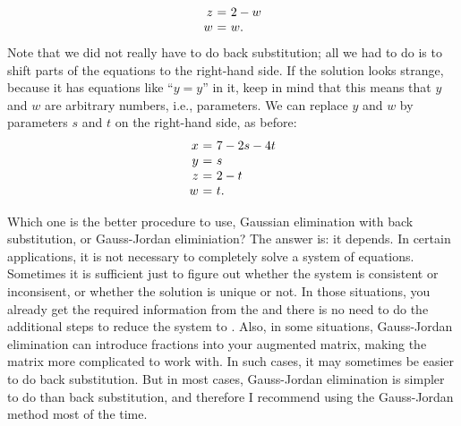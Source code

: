 \begin{solution}
\begin{equation*}
\begin{array}{r@{~}c@{~}l}
      z &=& 2-w \\
      w &=& w.
    \end{array}
  \end{equation*}
  Note that we did not really have to do back substitution; all we had
  to do is to shift parts of the equations to the right-hand side. If
  the solution looks strange, because it has equations like ``$y=y$''
  in it, keep in mind that this means that $y$ and $w$ are arbitrary
  numbers, i.e., parameters. We can replace $y$ and $w$ by parameters
  $s$ and $t$ on the right-hand side, as before:
  \begin{equation*}
    \begin{array}{r@{~}c@{~}l}
      x &=& 7-2s-4t \\
      y &=& s \\
      z &=& 2-t \\
      w &=& t.
    \end{array}
  \end{equation*}
\end{solution}

Which one is the better procedure to use, Gaussian elimination with
back substitution, or Gauss-Jordan eliminiation? The answer is: it
depends. In certain applications, it is not necessary to completely
solve a system of equations. Sometimes it is sufficient just to figure
out whether the system is consistent or inconsisent, or whether the
solution is unique or not. In those situations, you already get the
required information from the {\ef} and there is no need to do the
additional steps to reduce the system to {\rref}. Also, in some
situations, Gauss-Jordan elimination can introduce fractions into your
augmented matrix, making the matrix more complicated to work with. In
such cases, it may sometimes be easier to do back substitution. But in
most cases, Gauss-Jordan elimination is simpler to do than back
substitution, and therefore I recommend using the Gauss-Jordan method
most of the time. 
